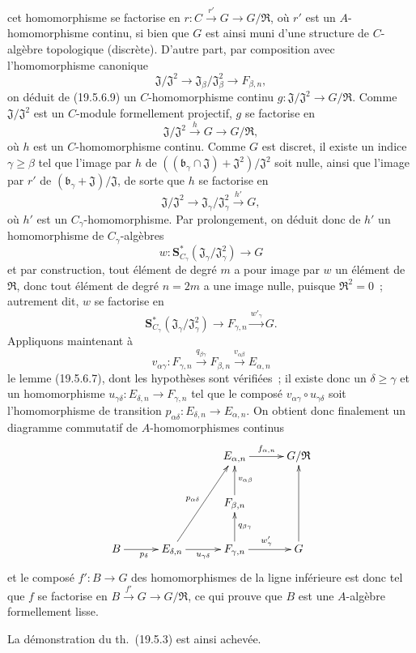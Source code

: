 \begin{env}[19.5.6.8]
cet homomorphisme se factorise en
$r:C\xrightarrow{r'}G\to G/\mathfrak R$, où $r'$ est un
$A$-homomorphisme continu, si bien que $G$ est ainsi muni d'une structure de
$C$-algèbre topologique (discrète). D'autre part, par composition avec
l'homomorphisme canonique
\[
  \mathfrak J/\mathfrak J^2\longrightarrow
  \mathfrak J_\beta/\mathfrak J_\beta^2\longrightarrow F_{\beta,n},
\]
on déduit de (19.5.6.9) un $C$-homomorphisme continu
$g:\mathfrak J/\mathfrak J^2\to G/\mathfrak R$. Comme
$\mathfrak J/\mathfrak J^2$ est un $C$-module formellement projectif, $g$ se
factorise en
\[
  \mathfrak J/\mathfrak J^2\xrightarrow{h}G\longrightarrow G/\mathfrak R,
\]
où $h$ est un $C$-homomorphisme continu. Comme $G$ est discret, il existe un
indice $\gamma\geq\beta$ tel que l'image par $h$ de
$((\mathfrak b_\gamma\cap\mathfrak J)+\mathfrak J^2)/\mathfrak J^2$ soit
nulle, ainsi que l'image par $r'$ de
$(\mathfrak b_\gamma+\mathfrak J)/\mathfrak J$, de sorte que $h$ se factorise
en
\[
  \mathfrak J/\mathfrak J^2\longrightarrow
  \mathfrak J_\gamma/\mathfrak J_\gamma^2
  \xrightarrow{h'}G,
\]
où $h'$ est un $C_\gamma$-homomorphisme. Par prolongement, on déduit donc de
$h'$ un homomorphisme de $C_\gamma$-algèbres
\[
  w:\mathbf S_{C_\gamma}^*(\mathfrak J_\gamma/\mathfrak J_\gamma^2)
  \longrightarrow G
\]
et par construction, tout élément de degré $m$ a pour image par $w$ un élément
de $\mathfrak R$, donc tout élément de degré $n=2m$ a une image nulle, puisque
$\mathfrak R^2=0$~; autrement dit, $w$ se factorise en
\[
  \mathbf S_{C_\gamma}^*(\mathfrak J_\gamma/\mathfrak J_\gamma^2)
  \longrightarrow F_{\gamma,n}\xrightarrow{w'_\gamma}G.
\]
Appliquons maintenant à
\[
  v_{\alpha\gamma}:F_{\gamma,n}
  \xrightarrow{q_{\beta\gamma}}F_{\beta,n}
  \xrightarrow{v_{\alpha\beta}}E_{\alpha,n}
\]
le lemme (19.5.6.7), dont les hypothèses sont vérifiées~; il existe donc un
$\delta\geq\gamma$ et un homomorphisme
$u_{\gamma\delta}:E_{\delta,n}\to F_{\gamma,n}$ tel que le composé
$v_{\alpha\gamma}\circ u_{\gamma\delta}$ soit l'homomorphisme de transition
$p_{\alpha\delta}:E_{\delta,n}\to E_{\alpha,n}$. On obtient donc finalement un
diagramme commutatif de $A$-homomorphismes continus
\[
\xymatrix@C=3em@R=2.5em{
  && E_{\alpha,n}\ar[r]^{f_{\alpha,n}} & G/\mathfrak R \\
  && F_{\beta,n}\ar[u]_{v_{\alpha\beta}} & \\
  B\ar[r]_{p_\delta} & E_{\delta,n}\ar[uur]^{p_{\alpha\delta}}
    \ar[r]_{u_{\gamma\delta}} &
  F_{\gamma,n}\ar[u]_{q_{\beta\gamma}}\ar[r]^{w'_\gamma} & G\ar[uu]
}
\]
et le composé $f':B\to G$ des homomorphismes de la ligne inférieure est donc
tel que $f$ se factorise en $B\xrightarrow{f'}G\to G/\mathfrak R$, ce qui
prouve que $B$ est une $A$-algèbre formellement lisse.

La démonstration du th.~(19.5.3) est ainsi achevée.
\end{env}

